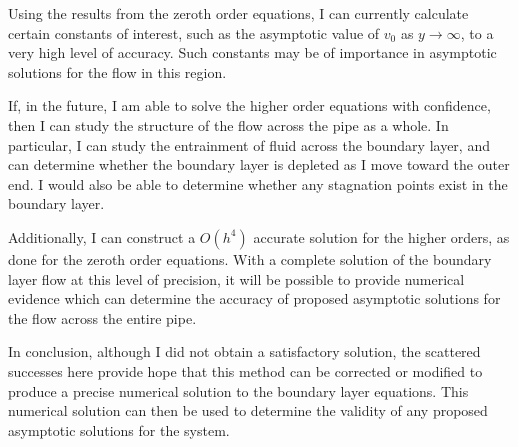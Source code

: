 \documentclass[10pt,a4paper]{report}
\begin{document}
Using the results from the zeroth order equations, I can currently calculate certain constants of interest, such as the asymptotic value of $v_0$ as $y \rightarrow \infty$, to a very high level of accuracy. Such constants may be of importance in asymptotic solutions for the flow in this region.

If, in the future, I am able to solve the higher order equations with confidence, then I can study the structure of the flow across the pipe as a whole. In particular, I can study the entrainment of fluid across the boundary layer, and can determine whether the boundary layer is depleted as I move toward the outer end. I would also be able to determine whether any stagnation points exist in the boundary layer.

Additionally, I can construct a $O(h^4)$ accurate solution for the higher orders, as done for the zeroth order equations. With a complete solution of the boundary layer flow at this level of precision, it will be possible to provide numerical evidence which can determine the accuracy of proposed asymptotic solutions for the flow across the entire pipe.

In conclusion, although I did not obtain a satisfactory solution, the scattered successes here provide hope that this method can be corrected or modified to produce a precise numerical solution to the boundary layer equations. This numerical solution can then be used to determine the validity of any proposed asymptotic solutions for the system.
\end{document}
